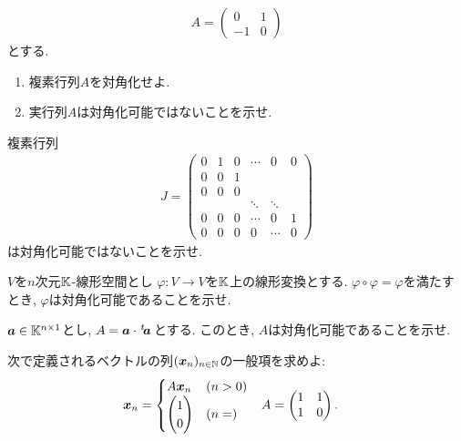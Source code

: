 \begin{quiz}
  \begin{align*}
    A=\begin{pmatrix}0&1\\-1&0\end{pmatrix}
  \end{align*}
  とする.
  \begin{enumerate}
  \item 複素行列$A$を対角化せよ.
  \item 実行列$A$は対角化可能ではないことを示せ.
  \end{enumerate}
\end{quiz}

\begin{quiz}
  複素行列
  \begin{align*}
    J=\begin{pmatrix}0&1&0&\cdots&0&0  \\0&0&1&\\0&0&0&\\&&&\ddots&\ddots\\0&0&0&\cdots&0&1\\0&0&0&0&\cdots&0\end{pmatrix}
  \end{align*}
  は対角化可能ではないことを示せ.
\end{quiz}

\begin{quiz}
  $V$を$n$次元$\mathbb{K}$-線形空間とし
  $\varphi\colon V\to V$を$\mathbb{K}$上の線形変換とする.
  $\varphi\circ \varphi = \varphi$を満たすとき,
  $\varphi$は対角化可能であることを示せ.
\end{quiz}

\begin{quiz}
  $\boldsymbol{a}\in\mathbb{K}^{n\times 1}$とし,
  $A=\boldsymbol{a}\cdot{\left.^{t}\!\boldsymbol{a}\right.}$とする.
  このとき,
  $A$は対角化可能であることを示せ.
\end{quiz}


\begin{quiz}
  次で定義されるベクトルの列$(\boldsymbol{x}_n)_{n\in\mathbb{N}}$の一般項を求めよ:
  \begin{align*}
    \boldsymbol{x}_n &=
    \begin{cases}
      A\boldsymbol{x}_n & (n>0)\\
      \begin{pmatrix}1\\0\end{pmatrix} & (n=)
    \end{cases}
    &
    A&=\begin{pmatrix}1&1\\1&0\end{pmatrix}.
  \end{align*}
\end{quiz}


